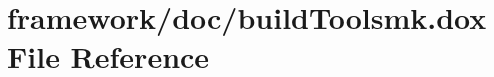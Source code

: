 \hypertarget{build_toolsmk_8dox}{}\section{framework/doc/build\+Toolsmk.dox File Reference}
\label{build_toolsmk_8dox}
